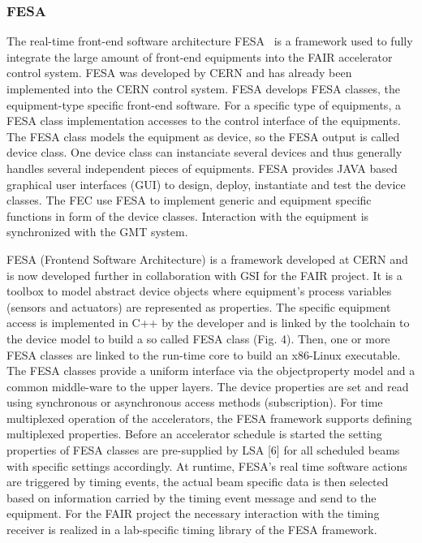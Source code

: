 \subsubsection{FESA}
The real-time front-end software architecture \gls{FESA}~\cite{hoffmann_fesafront-end_2008} is a framework used to fully integrate the large amount of front-end equipments into the FAIR accelerator control system. FESA was developed by CERN and has already been implemented into the CERN control system. FESA develops FESA classes, the equipment-type specific front-end software. For a specific type of equipments, a FESA class implementation accesses to the control interface of the equipments. The FESA class models the equipment as device, so the FESA output is called device class. One device class can instanciate several devices and thus generally handles several independent pieces of equipments.  FESA provides JAVA based graphical user interfaces (GUI) to design, deploy, instantiate and test the device classes. The FEC use FESA to implement generic and equipment specific functions in form of the device classes. Interaction with the equipment is synchronized with the GMT system. 

FESA (Frontend Software Architecture) is a framework developed at CERN and is now developed further in collaboration with GSI for the FAIR project. It is a toolbox to model abstract device objects where equipment’s process variables (sensors and actuators) are represented as properties. The specific equipment access is implemented in C++ by the developer and is linked by the toolchain
to the device model to build a so called FESA class (Fig. 4). Then, one or more FESA classes are linked to the run-time core to build an x86-Linux executable. The
FESA classes provide a uniform interface via the objectproperty model and a common middle-ware to the upper layers. The device properties are set and read using synchronous or asynchronous access methods (subscription). For time multiplexed operation of the accelerators, the FESA framework supports defining multiplexed properties. Before an accelerator schedule is started the setting properties of FESA classes are pre-supplied by LSA [6] for all scheduled beams with specific settings accordingly. At runtime, FESA’s real time software actions are triggered by timing events, the actual beam specific data is then selected based on information carried by the timing event message and send to the equipment. For the FAIR project the necessary interaction with the timing receiver is realized in a
lab-specific timing library of the FESA framework.


